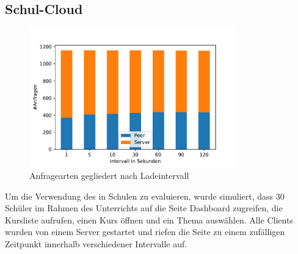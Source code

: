

\subsection{Schul-Cloud}
\begin{figure}[!h]
	\centering
	\includegraphics[width=0.8\textwidth]{figures/sc_stacked_interval}
	\caption[Anfragearten gegliedert nach Ladeintervall]{Anfragearten gegliedert nach Ladeintervall}
	\label{fig:sc_stacked_interval}
\end{figure}
Um die Verwendung des \cdns in Schulen zu evaluieren, wurde simuliert, dass 30 Schüler im Rahmen des Unterrichts auf die Seite Dashboard  zugreifen, die Kursliste aufrufen, einen Kurs öffnen und ein Thema auswählen. Alle Clients wurden von einem Server gestartet und riefen die Seite zu einem zufälligen Zeitpunkt innerhalb verschiedener Intervalle auf. 


